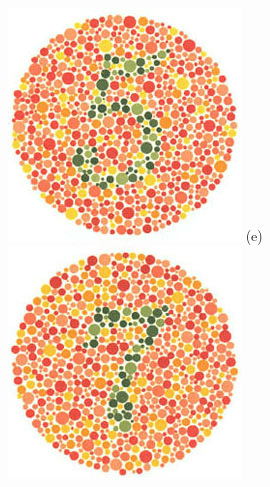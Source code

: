 \documentclass[	12pt, Times, openright, twoside, a4paper, english, brazil]{abntex2}
\begin{document}
\begin{apendicesenv}
\begin{figure}[!htb]
\centering
{\includegraphics[width=\linewidth]{ishihara-fuga/plate14.jpg}}
(e)
\endminipage\hfill
{}
\centering
{\includegraphics[width=\linewidth]{ishihara-fuga/plate15.jpg}}

\end{figure}
\end{apendicesenv}
\end{document}
